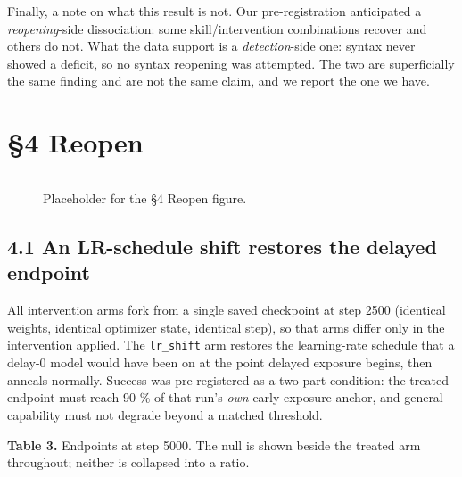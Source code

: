 \documentclass[11pt]{article}
\begin{document}
Finally, a note on what this result is not. Our pre-registration anticipated a
\emph{reopening}-side dissociation: some skill/intervention combinations recover and others do
not. What the data support is a \emph{detection}-side one: syntax never showed a deficit, so no
syntax reopening was attempted. The two are superficially the same finding and are not the
same claim, and we report the one we have.

\section{§4 Reopen}\label{reopen}

\begin{figure}[t]
\centering
\rule{\linewidth}{12.73\baselineskip}
\caption{Placeholder for the §4 Reopen figure.}
\end{figure}

\subsection{4.1 An LR-schedule shift restores the delayed endpoint}\label{an-lr-schedule-shift-restores-the-delayed-endpoint}

All intervention arms fork from a single saved checkpoint at step 2500 (identical weights,
identical optimizer state, identical step), so that arms differ only in the intervention
applied. The \texttt{lr\_shift} arm restores the learning-rate schedule that a delay-0 model would
have been on at the point delayed exposure begins, then anneals normally. Success was
pre-registered as a two-part condition: the treated endpoint must reach 90 \% of that run's
\emph{own} early-exposure anchor, and general capability must not degrade beyond a matched
threshold.

\textbf{Table 3.} Endpoints at step 5000. The null is shown beside the treated arm throughout;
neither is collapsed into a ratio.
\end{document}
